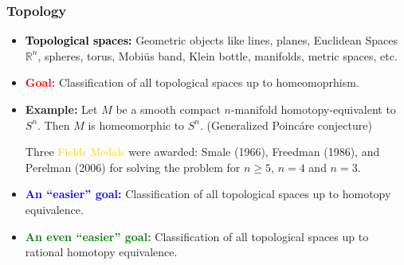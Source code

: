 \documentclass[dvipsnames]{beamer}
\theoremstyle{example}
\newcommand{\R}{\mathbb{R}}
\begin{document}
\begin{frame}\small
\frametitle{Topology}

\begin{itemize}

\item \textbf{\textcolor{Black}{Topological spaces:}} Geometric objects like lines, planes, Euclidean Spaces $\R^n$,
spheres, torus, Mobi\"{u}s band, Klein bottle, manifolds, metric spaces, etc.


\pause


\item \textbf{\textcolor{Red}{Goal:}}  Classification of all topological spaces up to homeomoprhism.\\
 


\pause

\item \textbf{Example:}  Let $M$ be a smooth compact $n$-manifold homotopy-equivalent to $S^n$. 
Then $M$ is homeomorphic to $S^n$.   \pause  (Generalized Poinc\'{a}re conjecture)
 

Three \textcolor{gold}{Fields Medals} were awarded:
Smale (1966), Freedman (1986), and Perelman (2006) for solving the problem
for $n\geq 5$, $n=4$ and $n=3$. 
 
\pause

\item \textbf{\textcolor{Blue}{An ``easier'' goal:}}  Classification of all topological spaces up to  homotopy equivalence.  

\pause

\item \textbf{\textcolor{Green}{An even ``easier'' goal:}}  Classification of all topological spaces up to rational homotopy equivalence. 

\end{itemize}
\end{frame}

\end{document}

